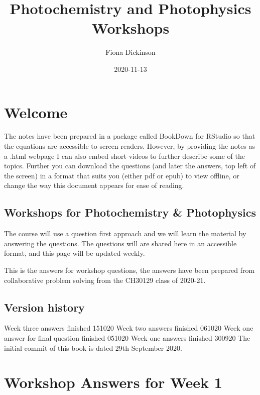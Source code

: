 \documentclass[
]{book}
\title{Photochemistry and Photophysics Workshops}
\author{Fiona Dickinson}
\date{2020-11-13}
\begin{document}
\maketitle

{
\setcounter{tocdepth}{1}
\tableofcontents
}
\hypertarget{welcome}{%
\chapter*{Welcome}\label{welcome}}

The notes have been prepared in a package called BookDown for RStudio so that the equations are accessible to screen readers. However, by providing the notes as a .html webpage I can also embed short videos to further describe some of the topics. Further you can download the questions (and later the answers, top left of the screen) in a format that suits you (either pdf or epub) to view offline, or change the way this document appears for ease of reading.

\hypertarget{workshops-for-photochemistry-photophysics}{%
\section*{Workshops for Photochemistry \& Photophysics}\label{workshops-for-photochemistry-photophysics}}

The course will use a question first approach and we will learn the material by answering the questions. The questions will are shared here in an accessible format, and this page will be updated weekly.

This is the answers for workshop questions, the answers have been prepared from collaborative problem solving from the CH30129 class of 2020-21.

\hypertarget{version-history}{%
\section*{Version history}\label{version-history}}

Week three answers finished 151020
Week two answers finished 061020
Week one answer for final question finished 051020
Week one answers finished 300920
The initial commit of this book is dated 29th September 2020.

\hypertarget{ch:Workshop1}{%
\chapter{Workshop Answers for Week 1}\label{ch:Workshop1}}
\end{document}
